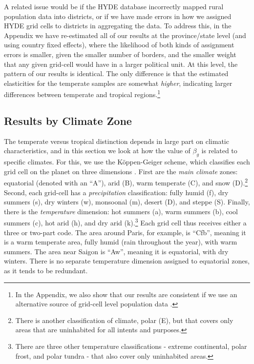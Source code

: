 A related issue would be if the HYDE database incorrectly mapped rural population data into districts, or if we have made errors in how we assigned HYDE grid cells to districts in aggregating the data. To address this, in the Appendix we have re-estimated all of our results at the province/state level (and using country fixed effects), where the likelihood of both kinds of assignment errors is smaller, given the smaller number of borders, and the smaller weight that any given grid-cell would have in a larger political unit. At this level, the pattern of our results is identical. The only difference is that the estimated elasticities for the temperate samples are somewhat \textit{higher}, indicating larger differences between temperate and tropical regions.\footnote{In the Appendix, we also show that our results are consistent if we use an alternative source of grid-cell level population data \citep{grump2011}.}

\subsection{Results by Climate Zone}
The temperate versus tropical distinction depends in large part on climatic characteristics, and in this section we look at how the value of $\beta_g$ is related to specific climates. For this, we use the K{\"o}ppen-Geiger scheme, which classifies each grid cell on the planet on three dimensions \citep{kottek2006}. First are the \textit{main climate} zones: equatorial (denoted with an ``A''), arid (B), warm temperate (C), and snow (D).\footnote{There is another classification of climate, polar (E), but that covers only areas that are uninhabited for all intents and purposes.} Second, each grid-cell has a \textit{precipitation} classification: fully humid (f), dry summers (s), dry winters (w), monsoonal (m), desert (D), and steppe (S). Finally, there is the \textit{temperature} dimension: hot summers (a), warm summers (b), cool summers (c), hot arid (h), and dry arid (k).\footnote{There are three other temperature classifications - extreme continental, polar frost, and polar tundra - that also cover only uninhabited areas.} Each grid cell thus receives either a three or two-part code. The area around Paris, for example, is ``Cfb'', meaning it is a warm temperate area, fully humid (rain throughout the year), with warm summers. The area near Saigon is ``Aw'', meaning it is equatorial, with dry winters. There is no separate temperature dimension assigned to equatorial zones, as it tends to be redundant.


